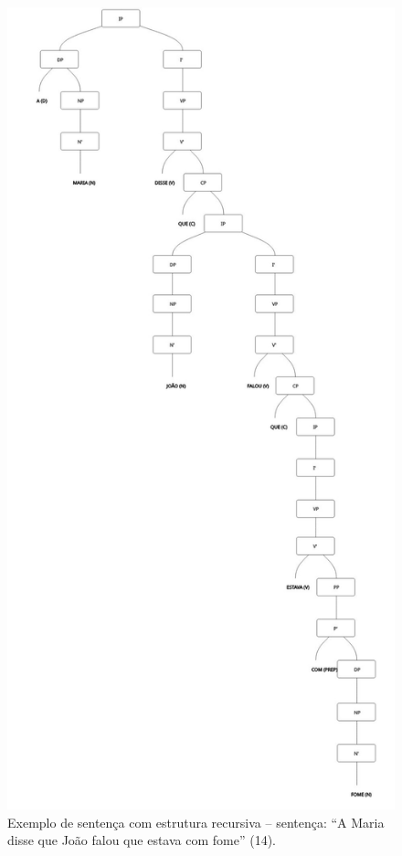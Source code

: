 \documentclass[portuguese]{textolivre}
\begin{document}
\begin{figure}[p]
 \centering
 \includegraphics[width=\textwidth,height=0.85\textheight,keepaspectratio]{Fig8.png}
 \caption{Exemplo de sentença com estrutura recursiva – sentença: “A Maria disse que João falou que estava com fome” (14).}
 \label{fig8}
\end{figure}
\end{document}
